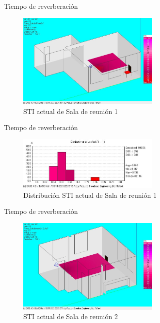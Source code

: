 \documentclass{sintefbeamer}
\begin{document}
\begin{frame}{Tiempo de reverberación}
    \begin{figure}
        \centering
        \includegraphics[width=7cm]{images/STI actual/STI_Reunion1_SinAcond.jpg}
        \caption{STI actual de Sala de reunión 1}
        \label{fig:STI actual sala reunion 1}
    \end{figure}
\end{frame}
\begin{frame}{Tiempo de reverberación}
    \begin{figure}
        \centering
        \includegraphics[width=7cm]{images/STI actual/STIdist_Reunion1_SinAcond.jpg}
        \caption{Distribución STI actual de Sala de reunión 1}
        \label{fig:distribución STI actual sala reunion 1}
    \end{figure}
\end{frame}

\begin{frame}{Tiempo de reverberación}
    \begin{figure}
        \centering
        \includegraphics[width=7cm]{images/STI actual/STI_Reunion2_SinAcond.jpg}
        \caption{STI actual de Sala de reunión 2}
        \label{fig:STI actual sala reunion 2}
    \end{figure}
\end{frame}
\end{document}
